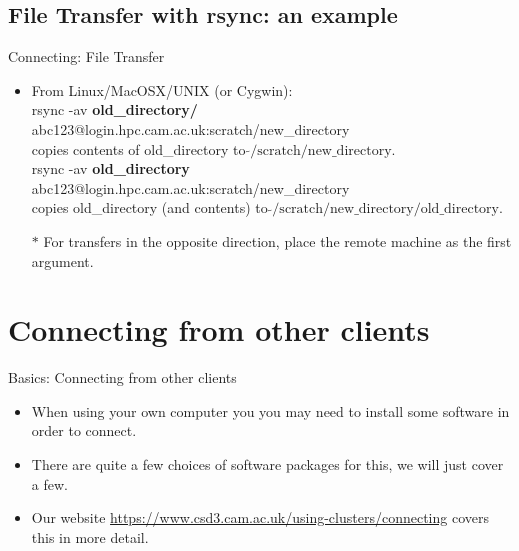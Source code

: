 \subsection{File Transfer with rsync: an example}
\begin{frame}{Connecting: File Transfer}
\begin{itemize}
\item From Linux/MacOSX/UNIX (or Cygwin):\hfill\\
\alert{\footnotesize rsync -av \textbf{old\_directory/} abc123@login.hpc.cam.ac.uk:scratch/new\_directory}\hfill\\
copies contents of old\_directory to $\tilde{}\text{/scratch/new\_directory}$.\hfill\\\smallskip
\pause
\alert{\footnotesize rsync -av \textbf{old\_directory} abc123@login.hpc.cam.ac.uk:scratch/new\_directory}\hfill\\
copies old\_directory (and contents) to $\tilde{}\text{/scratch/new\_directory/old\_directory}$.\hfill\\
\pause
\item[$\ast$]For transfers in the opposite direction, place the remote machine as the first argument.
\end{itemize}
\end{frame}
%
\section{Connecting from other clients}
\begin{frame}{Basics: Connecting from other clients}
\begin{itemize}
\item{When using your own computer you you may need to install some software in order to connect.}
\pause
\item{There are quite a few choices of software packages for this, we will just cover a few.}
\pause
\item{Our website \url{https://www.csd3.cam.ac.uk/using-clusters/connecting} covers this in more detail.}
\end{itemize}
\end{frame}

